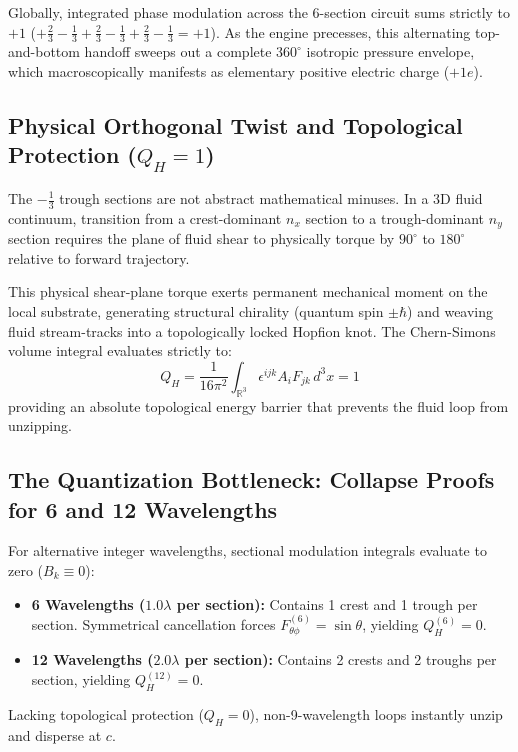 \documentclass[11pt,a4paper]{article}
\begin{document}
	Globally, integrated phase modulation across the 6-section circuit sums strictly to $+1$ ($+\frac{2}{3} - \frac{1}{3} + \frac{2}{3} - \frac{1}{3} + \frac{2}{3} - \frac{1}{3} = +1$). As the engine precesses, this alternating top-and-bottom handoff sweeps out a complete $360^\circ$ isotropic pressure envelope, which macroscopically manifests as elementary positive electric charge ($+1e$).
	
	\subsection{\texorpdfstring{Physical Orthogonal Twist and Topological Protection ($Q_H = 1$)}{Physical Orthogonal Twist and Topological Protection (Q\_H = 1)}}
	The $-\frac{1}{3}$ trough sections are not abstract mathematical minuses. In a 3D fluid continuum, transition from a crest-dominant $n_x$ section to a trough-dominant $n_y$ section requires the plane of fluid shear to physically torque by $90^\circ$ to $180^\circ$ relative to forward trajectory.
	
	This physical shear-plane torque exerts permanent mechanical moment on the local substrate, generating structural chirality (quantum spin $\pm\hbar$) and weaving fluid stream-tracks into a topologically locked Hopfion knot. The Chern-Simons volume integral evaluates strictly to:
	\begin{equation}
		Q_H = \frac{1}{16\pi^2} \int_{\mathbb{R}^3} \epsilon^{ijk} A_i F_{jk} \, d^3x = 1
	\end{equation}
	providing an absolute topological energy barrier that prevents the fluid loop from unzipping.
	
	\subsection{The Quantization Bottleneck: Collapse Proofs for 6 and 12 Wavelengths}
	For alternative integer wavelengths, sectional modulation integrals evaluate to zero ($B_k \equiv 0$):
	\begin{itemize}
		\item \textbf{6 Wavelengths ($1.0\lambda$ per section):} Contains 1 crest and 1 trough per section. Symmetrical cancellation forces $F_{\theta\phi}^{(6)} = \sin\theta$, yielding $Q_H^{(6)} = 0$.
		\item \textbf{12 Wavelengths ($2.0\lambda$ per section):} Contains 2 crests and 2 troughs per section, yielding $Q_H^{(12)} = 0$.
	\end{itemize}
	Lacking topological protection ($Q_H = 0$), non-9-wavelength loops instantly unzip and disperse at $c$.
	
\end{document}
